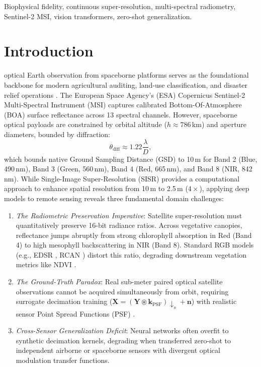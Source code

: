\documentclass[letterpaper,journal,twoside]{IEEEtran}
\begin{document}
\begin{IEEEkeywords}
Biophysical fidelity, continuous super-resolution, multi-spectral radiometry, Sentinel-2 MSI, vision transformers, zero-shot generalization.
\end{IEEEkeywords}

\section{Introduction}
 optical Earth observation from spaceborne platforms serves as the foundational backbone for modern agricultural auditing, land-use classification, and disaster relief operations \cite{drusch2012sentinel}. The European Space Agency's (ESA) Copernicus Sentinel-2 Multi-Spectral Instrument (MSI) captures calibrated Bottom-Of-Atmosphere (BOA) surface reflectance across 13 spectral channels. However, spaceborne optical payloads are constrained by orbital altitude ($h \approx 786$\,km) and aperture diameters, bounded by diffraction:
\begin{equation}
\theta_{\text{diff}} \approx 1.22 \frac{\lambda}{D},
\label{eq:diffraction}
\end{equation}
which bounds native Ground Sampling Distance (GSD) to 10\,m for Band 2 (Blue, 490\,nm), Band 3 (Green, 560\,nm), Band 4 (Red, 665\,nm), and Band 8 (NIR, 842\,nm). While Single-Image Super-Resolution (SISR) provides a computational approach to enhance spatial resolution from 10\,m to 2.5\,m ($4\times$), applying deep models to remote sensing reveals three fundamental domain challenges:

\begin{enumerate}[leftmargin=*,itemsep=1.0pt,topsep=1.2pt,parsep=0pt]
    \item \textit{The Radiometric Preservation Imperative}: Satellite super-resolution must quantitatively preserve 16-bit radiance ratios. Across vegetative canopies, reflectance jumps abruptly from strong chlorophyll absorption in Red (Band 4) to high mesophyll backscattering in NIR (Band 8). Standard RGB models (e.g., EDSR \cite{lim2017enhanced}, RCAN \cite{zhang2018rcan}) distort this ratio, degrading downstream vegetation metrics like NDVI \cite{rouse1974monitoring}.
    \item \textit{The Ground-Truth Paradox}: Real sub-meter paired optical satellite observations cannot be acquired simultaneously from orbit, requiring surrogate decimation training ($\mathbf{X} = (\mathbf{Y} \circledast \mathbf{k}_{\text{PSF}})\downarrow_s + \mathbf{n}$) with realistic sensor Point Spread Functions (PSF) \cite{lanaras2018super}.
    \item \textit{Cross-Sensor Generalization Deficit}: Neural networks often overfit to synthetic decimation kernels, degrading when transferred zero-shot to independent airborne or spaceborne sensors with divergent optical modulation transfer functions.
\end{enumerate}
\end{document}

